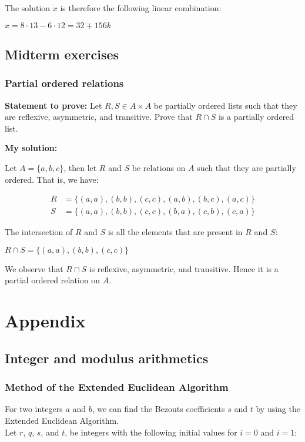 \documentclass{report}
\newcommand{\cent}[1]{\begin{center}#1\end{center}}
\newcommand{\mAlign}[1]{\begin{align*}#1\end{align*}}
\newcommand{\In}{\! \in \!}
\newcommand{\Prove}{\textbf{Statement to prove: }}
\newcommand{\solution}{\textbf{My solution: }}
\begin{document}
 	The solution $x$ is therefore the following linear combination:
 	
 	\cent{$x = 8\cdot 13 - 6 \cdot 12 = 32 + 156k$}
	\section{Midterm exercises}
 	\subsection{Partial ordered relations}
	 
	\Prove
	Let $R,S\In A \times A$ be partially ordered lists such that they are reflexive, asymmetric, and transitive. Prove that $R\cap S$ is a partially ordered list.
	
	\solution
	 
	Let $A=\{a,b,c\}$, then let $R$ and $S$ be relations on $A$ such that they are partially ordered. That is, we have:
	 
	\mAlign{R&=\{(a,a),(b,b),(c,c),(a,b),(b,c),(a,c)\}\\
	 			   S&= \{(a,a),(b,b),(c,c),(b,a),(c,b),(c,a)\}}
	 
	The intersection of $R$ and $S$ is all the elements that are present in $R$ and $S$:
	 
	\cent{$R \cap S = \{(a,a),(b,b),(c,c)\}$}
	 
	We observe that $R \cap S$ is reflexive, asymmetric, and transitive.  Hence it is a partial ordered relation on $A$.
	
	\chapter{Appendix}
	\pagebreak
	
	\section{Integer and modulus arithmetics}
	\subsection{Method of the Extended Euclidean Algorithm}
	
	For two integers $a$ and $b$, we can find the Bezouts coefficients $s$ and $t$ by using the Extended Euclidean Algorithm.\\
	
	Let $r$, $q$, $s$, and $t$, be integers with the following initial values for $i=0$ and  $i=1$:
	
\end{document}
